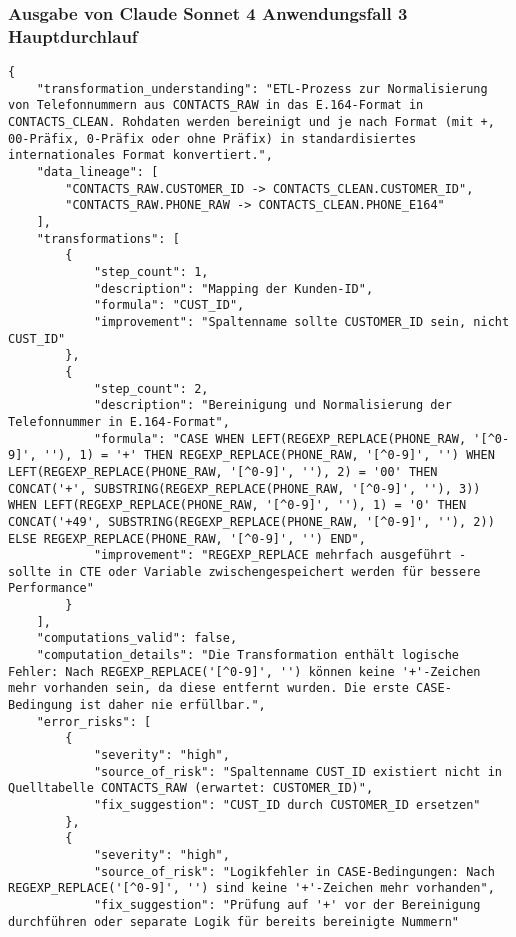 \subsubsection{Ausgabe von Claude Sonnet 4 Anwendungsfall 3 Hauptdurchlauf}\label{anhang:subsubsec:claude_case3_prompt1}
\begin{lstlisting}[caption={Ausgabe: Claude Sonnet 4 Anwendungsfall 3 Hauptdurchlauf},label={claude_case3_prompt1}]
{
    "transformation_understanding": "ETL-Prozess zur Normalisierung von Telefonnummern aus CONTACTS_RAW in das E.164-Format in CONTACTS_CLEAN. Rohdaten werden bereinigt und je nach Format (mit +, 00-Präfix, 0-Präfix oder ohne Präfix) in standardisiertes internationales Format konvertiert.",
    "data_lineage": [
        "CONTACTS_RAW.CUSTOMER_ID -> CONTACTS_CLEAN.CUSTOMER_ID",
        "CONTACTS_RAW.PHONE_RAW -> CONTACTS_CLEAN.PHONE_E164"
    ],
    "transformations": [
        {
            "step_count": 1,
            "description": "Mapping der Kunden-ID",
            "formula": "CUST_ID",
            "improvement": "Spaltenname sollte CUSTOMER_ID sein, nicht CUST_ID"
        },
        {
            "step_count": 2,
            "description": "Bereinigung und Normalisierung der Telefonnummer in E.164-Format",
            "formula": "CASE WHEN LEFT(REGEXP_REPLACE(PHONE_RAW, '[^0-9]', ''), 1) = '+' THEN REGEXP_REPLACE(PHONE_RAW, '[^0-9]', '') WHEN LEFT(REGEXP_REPLACE(PHONE_RAW, '[^0-9]', ''), 2) = '00' THEN CONCAT('+', SUBSTRING(REGEXP_REPLACE(PHONE_RAW, '[^0-9]', ''), 3)) WHEN LEFT(REGEXP_REPLACE(PHONE_RAW, '[^0-9]', ''), 1) = '0' THEN CONCAT('+49', SUBSTRING(REGEXP_REPLACE(PHONE_RAW, '[^0-9]', ''), 2)) ELSE REGEXP_REPLACE(PHONE_RAW, '[^0-9]', '') END",
            "improvement": "REGEXP_REPLACE mehrfach ausgeführt - sollte in CTE oder Variable zwischengespeichert werden für bessere Performance"
        }
    ],
    "computations_valid": false,
    "computation_details": "Die Transformation enthält logische Fehler: Nach REGEXP_REPLACE('[^0-9]', '') können keine '+'-Zeichen mehr vorhanden sein, da diese entfernt wurden. Die erste CASE-Bedingung ist daher nie erfüllbar.",
    "error_risks": [
        {
            "severity": "high",
            "source_of_risk": "Spaltenname CUST_ID existiert nicht in Quelltabelle CONTACTS_RAW (erwartet: CUSTOMER_ID)",
            "fix_suggestion": "CUST_ID durch CUSTOMER_ID ersetzen"
        },
        {
            "severity": "high",
            "source_of_risk": "Logikfehler in CASE-Bedingungen: Nach REGEXP_REPLACE('[^0-9]', '') sind keine '+'-Zeichen mehr vorhanden",
            "fix_suggestion": "Prüfung auf '+' vor der Bereinigung durchführen oder separate Logik für bereits bereinigte Nummern"

\end{lstlisting}
